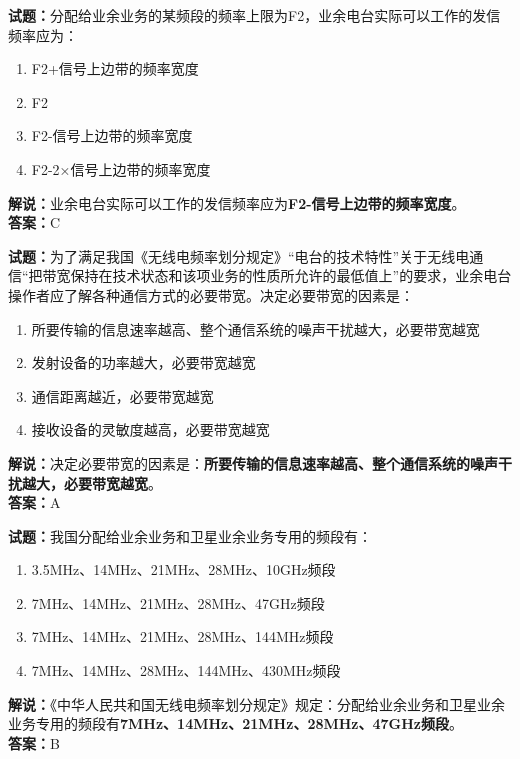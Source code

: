 \documentclass{ctexbook}
\begin{document}
\bigskip


\noindent\textbf{试题：}分配给业余业务的某频段的频率上限为F2，业余电台实际可以工作的发信频率应为：
\begin{enumerate}[leftmargin=3em]
\item F2+信号上边带的频率宽度
\item F2
\item F2-信号上边带的频率宽度
\item F2-2×信号上边带的频率宽度
\end{enumerate}
\noindent\textbf{解说：}业余电台实际可以工作的发信频率应为\textbf{F2-信号上边带的频率宽度}。\\\noindent\textbf{答案：}C





\bigskip


\noindent\textbf{试题：}为了满足我国《无线电频率划分规定》“电台的技术特性”关于无线电通信“把带宽保持在技术状态和该项业务的性质所允许的最低值上”的要求，业余电台操作者应了解各种通信方式的必要带宽。决定必要带宽的因素是：
\begin{enumerate}[leftmargin=3em]
\item 所要传输的信息速率越高、整个通信系统的噪声干扰越大，必要带宽越宽
\item 发射设备的功率越大，必要带宽越宽
\item 通信距离越近，必要带宽越宽
\item 接收设备的灵敏度越高，必要带宽越宽
\end{enumerate}
\noindent\textbf{解说：}决定必要带宽的因素是：\textbf{所要传输的信息速率越高、整个通信系统的噪声干扰越大，必要带宽越宽}。\\\noindent\textbf{答案：}A



\bigskip


\noindent\textbf{试题：}我国分配给业余业务和卫星业余业务专用的频段有：
\begin{enumerate}[leftmargin=3em]
\item 3.5MHz、14MHz、21MHz、28MHz、10GHz频段
\item 7MHz、14MHz、21MHz、28MHz、47GHz频段
\item 7MHz、14MHz、21MHz、28MHz、144MHz频段
\item 7MHz、14MHz、28MHz、144MHz、430MHz频段
\end{enumerate}
\noindent\textbf{解说：}《中华人民共和国无线电频率划分规定》规定：分配给业余业务和卫星业余业务专用的频段有\textbf{7MHz、14MHz、21MHz、28MHz、47GHz频段}。\\\noindent\textbf{答案：}B
\end{document}
